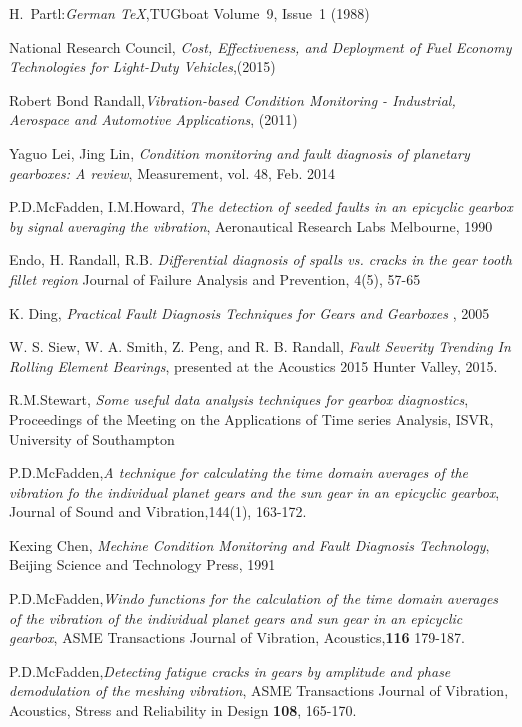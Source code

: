 \documentclass[]{unswthesis}
\begin{document}
\begin{thebibliography}{99}
  H.~Partl:\emph{German \TeX},TUGboat Volume~9, Issue~1 (1988)
 
  National Research Council, \textit{Cost, Effectiveness, and Deployment of Fuel Economy Technologies for Light-Duty Vehicles},(2015)
 
  Robert Bond Randall,\textit{Vibration-based Condition Monitoring - Industrial, Aerospace and Automotive Applications}, (2011) 
 
  Yaguo Lei, Jing Lin,\textit{ Condition monitoring and fault diagnosis of planetary gearboxes: A review}, Measurement, vol. 48, Feb. 2014
  
  P.D.McFadden, I.M.Howard, \textit{The detection of seeded faults in an epicyclic gearbox by signal averaging the vibration}, Aeronautical Research Labs Melbourne, 1990
 
   Endo, H. Randall, R.B. \textit{Differential diagnosis of spalls vs. cracks in the gear tooth fillet region} Journal of Failure Analysis and Prevention, 4(5), 57-65
 
   K. Ding, \textit{Practical Fault Diagnosis Techniques for Gears and Gearboxes }, 2005

   W. S. Siew, W. A. Smith, Z. Peng, and R. B. Randall, \textit{Fault Severity Trending In Rolling Element Bearings}, presented at the Acoustics 2015 Hunter Valley, 2015.
 
   R.M.Stewart, \textit{Some useful data analysis techniques for gearbox diagnostics}, Proceedings of the Meeting on the Applications of Time series Analysis, ISVR, University of Southampton
 
  P.D.McFadden,\textit{A technique for calculating the time domain averages of the vibration fo the individual planet gears and the sun gear in an epicyclic gearbox}, Journal of Sound and Vibration,144(1), 163-172.

  Kexing Chen, \textit{Mechine Condition Monitoring and Fault Diagnosis Technology}, Beijing Science and Technology Press, 1991
 
  P.D.McFadden,\textit{Windo functions for the calculation of the time domain averages of the vibration of the individual planet gears and sun gear in an epicyclic gearbox}, ASME Transactions Journal of Vibration, Acoustics,\textbf{116} 179-187.
 
  P.D.McFadden,\textit{Detecting fatigue cracks in gears by amplitude and phase demodulation of the meshing vibration}, ASME Transactions Journal of Vibration, Acoustics, Stress and Reliability in Design \textbf{108}, 165-170.
   

\end{thebibliography}
\end{document}
